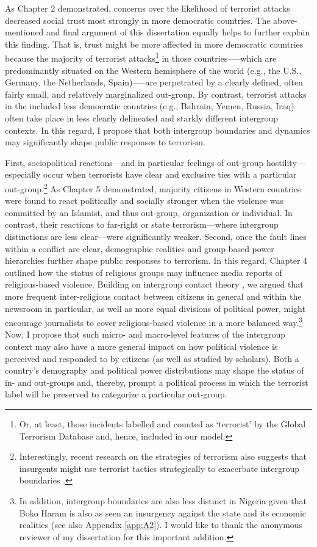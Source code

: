 As Chapter 2 demonstrated, concerns over the likelihood of terrorist attacks decreased social trust most strongly in more democratic countries. The above-mentioned and final argument of this dissertation equally helps to further explain this finding. That is, trust might be more affected in more democratic countries because the majority of terrorist attacks\footnote{Or, at least, those incidents labelled and counted as ‘terrorist’ by the Global Terrorism Database and, hence, included in our model.} in those countries—--which are predominantly situated on the Western hemisphere of the world (e.g., the U.S., Germany, the Netherlands, Spain)—--are perpetrated by a clearly defined, often fairly small, and relatively marginalized out-group. By contrast, terrorist attacks in the included less democratic countries (e.g., Bahrain, Yemen, Russia, Iraq) often take place in less clearly delineated and starkly different intergroup contexts. In this regard, I propose that both intergroup boundaries and dynamics may significantly shape public responses to terrorism. 


First, sociopolitical reactions---and in particular feelings of out-group hostility---especially occur when terrorists have clear and exclusive ties with a particular out-group.\footnote{Interestingly, recent research on the strategies of terrorism also suggests that insurgents might use terrorist tactics strategically to exacerbate intergroup boundaries \citep[][p. 2031]{Polo2020}.} As Chapter 5 demonstrated, majority citizens in Western countries were found to react politically and socially stronger when the violence was committed by an Islamist, and thus out-group, organization or individual. In contrast, their reactions to far-right or state terrorism---where intergroup distinctions are less clear---were significantly weaker. Second, once the fault lines within a conflict are clear, demographic realities and group-based power hierarchies further shape public responses to terrorism. In this regard, Chapter 4 outlined how the status of religious groups may influence media reports of religious-based violence. Building on intergroup contact theory \citep{Pettigrew2006, Pettigrew2008a}, we argued that more frequent inter-religious contact between citizens in general and within the newsroom in particular, as well as more equal divisions of political power, might encourage journalists to cover religious-based violence in a more balanced way.\footnote{In addition, intergroup boundaries are also less distinct in Nigeria given that Boko Haram is also as seen an insurgency against the state and its economic realities (see also Appendix \ref{app:A2}). I would like to thank the anonymous reviewer of my dissertation for this important addition.} Now, I propose that such micro- and macro-level features of the intergroup context may also have a more general impact on how political violence is perceived and responded to by citizens (as well as studied by scholars). Both a country’s demography and political power distributions may shape the status of in- and out-groups and, thereby, prompt a political process in which the terrorist label will be preserved to categorize a particular out-group.


